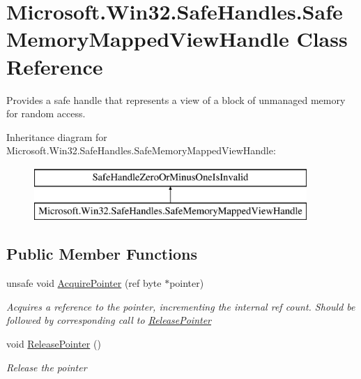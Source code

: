 \hypertarget{class_microsoft_1_1_win32_1_1_safe_handles_1_1_safe_memory_mapped_view_handle}{}\section{Microsoft.\+Win32.\+Safe\+Handles.\+Safe\+Memory\+Mapped\+View\+Handle Class Reference}
\label{class_microsoft_1_1_win32_1_1_safe_handles_1_1_safe_memory_mapped_view_handle}


Provides a safe handle that represents a view of a block of unmanaged memory for random access.  


Inheritance diagram for Microsoft.\+Win32.\+Safe\+Handles.\+Safe\+Memory\+Mapped\+View\+Handle\+:\begin{figure}[H]
\begin{center}
\leavevmode
\includegraphics[height=2.000000cm]{class_microsoft_1_1_win32_1_1_safe_handles_1_1_safe_memory_mapped_view_handle}
\end{center}
\end{figure}
\subsection*{Public Member Functions}
\begin{DoxyCompactItemize}
\item 
unsafe void \hyperlink{class_microsoft_1_1_win32_1_1_safe_handles_1_1_safe_memory_mapped_view_handle_a1f6fb93194f18b330b5aa072c6c38e71}{Acquire\+Pointer} (ref byte $\ast$pointer)
\begin{DoxyCompactList}\small\item\em Acquires a reference to the pointer, incrementing the internal ref count. Should be followed by corresponding call to \hyperlink{class_microsoft_1_1_win32_1_1_safe_handles_1_1_safe_memory_mapped_view_handle_a1efedd65922990f23bd513b12127bf49}{Release\+Pointer} \end{DoxyCompactList}\item 
void \hyperlink{class_microsoft_1_1_win32_1_1_safe_handles_1_1_safe_memory_mapped_view_handle_a1efedd65922990f23bd513b12127bf49}{Release\+Pointer} ()
\begin{DoxyCompactList}\small\item\em Release the pointer \end{DoxyCompactList}\end{DoxyCompactItemize}
